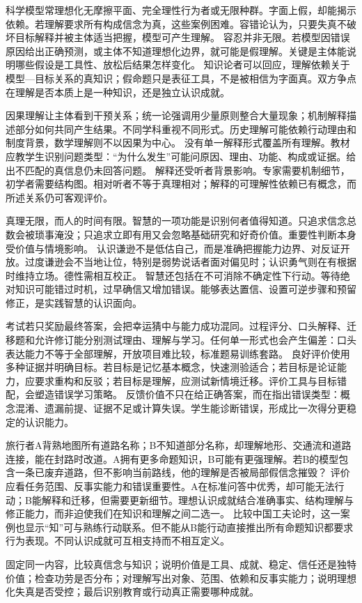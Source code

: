 科学模型常理想化无摩擦平面、完全理性行为者或无限种群。字面上假，却能揭示依赖。若理解要求所有构成信念为真，这些案例困难。容错论认为，只要失真不破坏目标解释并被主体适当把握，模型可产生理解。 容忍并非无限。若模型因错误原因给出正确预测，或主体不知道理想化边界，就可能是假理解。关键是主体能说明哪些假设是工具性、放松后结果怎样变化。 知识论者可以回应，理解依赖关于模型—目标关系的真知识；假命题只是表征工具，不是被相信为字面真。双方争点在理解是否本质上是一种知识，还是独立认识成就。

因果理解让主体看到干预关系；统一论强调用少量原则整合大量现象；机制解释描述部分如何共同产生结果。不同学科重视不同形式。历史理解可能依赖行动理由和制度背景，数学理解则不以因果为中心。 没有单一解释形式覆盖所有理解。教材应教学生识别问题类型：“为什么发生”可能问原因、理由、功能、构成或证据。给出不匹配的真信息仍未回答问题。 解释还受听者背景影响。专家需要机制细节，初学者需要结构图。相对听者不等于真理相对；解释的可理解性依赖已有概念，而所述关系仍可客观评价。

真理无限，而人的时间有限。智慧的一项功能是识别何者值得知道。只追求信念总数会被琐事淹没；只追求立即有用又会忽略基础研究和好奇价值。重要性判断本身受价值与情境影响。 认识谦逊不是低估自己，而是准确把握能力边界、对反证开放。过度谦逊会不当地让位，特别是弱势说话者面对偏见时；认识勇气则在有根据时维持立场。德性需相互校正。 智慧还包括在不可消除不确定性下行动。等待绝对知识可能错过时机，过早确信又增加错误。能够表达置信、设置可逆步骤和预留修正，是实践智慧的认识面向。

考试若只奖励最终答案，会把幸运猜中与能力成功混同。过程评分、口头解释、迁移题和允许修订能分别测试理由、理解与学习。任何单一形式也会产生偏差：口头表达能力不等于全部理解，开放项目难比较，标准题易训练套路。 良好评价使用多种证据并明确目标。若目标是记忆基本概念，快速测验适合；若目标是论证能力，应要求重构和反驳；若目标是理解，应测试新情境迁移。评价工具与目标错配，会塑造错误学习策略。 反馈价值不只在给正确答案，而在指出错误类型：概念混淆、遗漏前提、证据不足或计算失误。学生能诊断错误，形成比一次得分更稳定的认识能力。

旅行者A背熟地图所有道路名称；B不知道部分名称，却理解地形、交通流和道路连接，能在封路时改道。A拥有更多命题知识，B可能有更强理解。若B的模型包含一条已废弃道路，但不影响当前路线，他的理解是否被局部假信念摧毁？ 评价应看任务范围、反事实能力和错误重要性。A在标准问答中优秀，却可能无法行动；B能解释和迁移，但需要更新细节。理想认识成就结合准确事实、结构理解与修正能力，而非迫使我们在知识和理解之间二选一。 比较中国工夫论时，这一案例也显示“知”可与熟练行动联系。但不能从B能行动直接推出所有命题知识都要求行为表现。不同认识成就可互相支持而不相互定义。

\begin{tcolorbox}[breakable,colback=white,colframe=blue!30!black,title={认识价值分析表},fonttitle=\bfseries]
固定同一内容，比较真信念与知识；说明价值是工具、成就、稳定、信任还是独特价值；检查功劳是否分布；对理解写出对象、范围、依赖和反事实能力；说明理想化失真是否受控；最后识别教育或行动真正需要哪种成就。
\end{tcolorbox}
